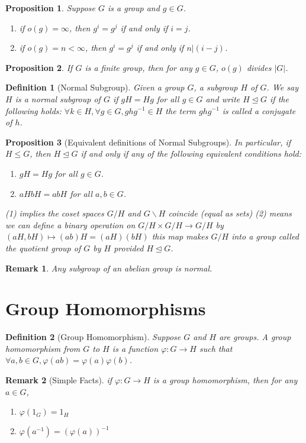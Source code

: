 \documentclass[12pt]{article}
\newtheorem{definition}{Definition}[section]
\newtheorem{proposition}{Proposition}[section]
\newtheorem{remark}{Remark}[section]
\begin{document}
\begin{proposition}
    Suppose $G$ is a group and $g \in G$.
    \begin{enumerate}
        \item if $o(g) = \infty$, then $g^i = g^j$ if and only if $i = j$.
        \item if $o(g) = n < \infty$, then $g^i = g^j$ if and only if $n | (i-j)$.
    \end{enumerate}
\end{proposition}

\begin{proposition}
If $G$ is a finite group, then for any $g \in G$, $o(g)$ divides $|G|$.
\end{proposition}

\begin{definition}[Normal Subgroup]
Given a group $G$, a subgroup $H$ of $G$. We say $H$ is a \emph{normal subgroup} of $G$ if $gH = Hg$ for all $g \in G$ and write $H \trianglelefteq G$ if the following holds: $\forall k \in H, \forall g \in G, ghg^{-1} \in H$ the term $ghg^{-1}$ is called a conjugate of $h$.
\end{definition}

\begin{proposition}[Equivalent definitions of Normal Subgroups]
    In particular, if $H \leq G$, then $H \trianglelefteq G$ if and only if any of the following equivalent conditions hold:
    \begin{enumerate}
        \item $gH = Hg$ for all $g \in G$.
        \item $aHbH = abH$ for all $a,b \in G$.
    \end{enumerate}
    (1) implies the coset spaces $G/H$ and $G\backslash H$ coincide (equal as sets)
    (2) means we can define a binary operation on $G/H \times G/H \to G/H$ by $(aH,bH) \mapsto (ab)H = (aH)(bH)$ 
    this map makes $G/H$ into a group called the quotient group of $G$ by $H$ provided $H \trianglelefteq G$.
\end{proposition}

\begin{remark}
    Any subgroup of an abelian group is normal.
\end{remark}

\section{Group Homomorphisms}

\begin{definition}[Group Homomorphism]
Suppose $G$ and $H$ are groups. A group homomorphism from $G$ to $H$ is a function $\varphi : G \to H$ such that
$\forall a,b \in G, \varphi(ab) = \varphi(a)\varphi(b)$.
\end{definition}
\begin{remark}[Simple Facts]
    if $\varphi : G \to H$ is a group homomorphism, then for any $a \in G$,
    \begin{enumerate}
        \item $\varphi(1_G) = 1_H$
        \item $\varphi(a^{-1}) = (\varphi(a))^{-1}$
    \end{enumerate}
\end{remark}
\end{document}
